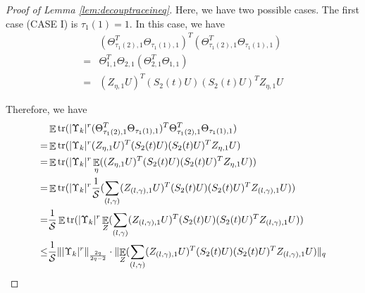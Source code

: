\documentclass[11pt]{amsart}
\numberwithin{equation}{section}
\numberwithin{equation}{section}
\DeclareMathOperator{\E}{\mathbb{E}}
\DeclareMathOperator*{\tr}{tr}
\newcommand{\cS}{\mathcal{S}}
\DeclarePairedDelimiter{\norm}{\lVert}{\rVert}
\theoremstyle{remark}
\theoremstyle{definition}
\begin{document}
\begin{proof}[Proof of Lemma \ref{lem:decouptraceineq}]
Here, we have two possible cases. The first case (CASE I) is $\tau_1(1)=1$. In this case, we have
\begin{align*}
   & (\Theta_{\tau_{1}(2),1}^T\Theta_{\tau_{1}(1),1})^T (\Theta_{\tau_{1}(2),1}^T\Theta_{\tau_{1}(1),1})\\
   =&\Theta_{1,1}^T\Theta_{2,1} (\Theta_{2,1}^T\Theta_{1,1})\\=&(Z_{\eta,1}U)^T(S_2(t)U)(S_2(t)U )^TZ_{\eta,1}U 
\end{align*}



Therefore, we have
\begin{align*}
& \E\tr( |\Upsilon_k|^{r}  (\Theta_{\tau_{1}(2),1}^T\Theta_{\tau_{1}(1),1})^T \Theta_{\tau_{1}(2),1}^T\Theta_{\tau_{1}(1),1})\\=&\E\tr( |\Upsilon_k|^{r}  (Z_{\eta,1}U)^T(S_2(t)U)(S_2(t)U )^TZ_{\eta,1}U )
    \\=&\E\tr( |\Upsilon_k|^{r}  \E_{\eta}((Z_{\eta,1}U)^T(S_2(t)U)(S_2(t)U )^TZ_{\eta,1}U) )
    \\=&\E\tr( |\Upsilon_k|^{r}  \frac{1}{\cS}(\sum_{(l,\gamma)}(Z_{(l,\gamma),1}U)^T(S_2(t)U)(S_2(t)U )^TZ_{(l,\gamma),1}U) )
    \\=&\frac{1}{\cS}\E\tr( |\Upsilon_k|^{r}  \E_{Z}(\sum_{(l,\gamma)}(Z_{(l,\gamma),1}U)^T(S_2(t)U)(S_2(t)U )^TZ_{(l,\gamma),1}U) )
    \\ \le& \frac{1}{\cS} \norm{|\Upsilon_k|^{r}}_{\frac{2q}{2q-2}} \cdot \norm{\E_{Z}(\sum_{(l,\gamma)}(Z_{(l,\gamma),1}U)^T(S_2(t)U)(S_2(t)U )^TZ_{(l,\gamma),1}U)}_{q}
\end{align*}


\end{proof}
\end{document}

